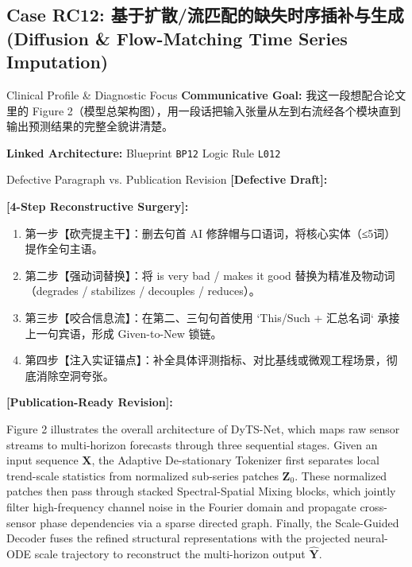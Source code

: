 \subsection{Case RC12: 基于扩散/流匹配的缺失时序插补与生成 (Diffusion \& Flow-Matching Time Series Imputation)}\label{case:RC12}
\begin{ConceptBox}{Clinical Profile \& Diagnostic Focus}
\textbf{Communicative Goal:} 我这一段想配合论文里的 Figure 2（模型总架构图），用一段话把输入张量从左到右流经各个模块直到输出预测结果的完整全貌讲清楚。\par
\textbf{Linked Architecture:} Blueprint \texttt{BP12} \enspace\textbar\enspace Logic Rule \texttt{L012}
\end{ConceptBox}
\begin{ExampleBox}{Defective Paragraph vs. Publication Revision}
\textbf{\color{TargetHighlight}[Defective Draft]:}\par
{}\par\vspace{6pt}
\textbf{\color{AcadForest}[4-Step Reconstructive Surgery]:}
\begin{enumerate}[label=\textbf{\color{AcadNavy}Step \arabic*:}, leftmargin=2em]
  \item 第一步【砍壳提主干】：删去句首 AI 修辞帽与口语词，将核心实体（≤5词）提作全句主语。
  \item 第二步【强动词替换】：将 is very bad / makes it good 替换为精准及物动词（degrades / stabilizes / decouples / reduces）。
  \item 第三步【咬合信息流】：在第二、三句句首使用 `This/Such + 汇总名词` 承接上一句宾语，形成 Given-to-New 锁链。
  \item 第四步【注入实证锚点】：补全具体评测指标、对比基线或微观工程场景，彻底消除空洞夸张。
\end{enumerate}\vspace{4pt}
\textbf{\color{AcadNavy}[Publication-Ready Revision]:}\par
Figure 2 illustrates the overall architecture of DyTS-Net, which maps raw sensor streams to multi-horizon forecasts through three sequential stages. Given an input sequence $\mathbf{X}$, the Adaptive De-stationary Tokenizer first separates local trend-scale statistics from normalized sub-series patches $\mathbf{Z}_0$. These normalized patches then pass through stacked Spectral-Spatial Mixing blocks, which jointly filter high-frequency channel noise in the Fourier domain and propagate cross-sensor phase dependencies via a sparse directed graph. Finally, the Scale-Guided Decoder fuses the refined structural representations with the projected neural-ODE scale trajectory to reconstruct the multi-horizon output $\hat{\mathbf{Y}}$.
\end{ExampleBox}
